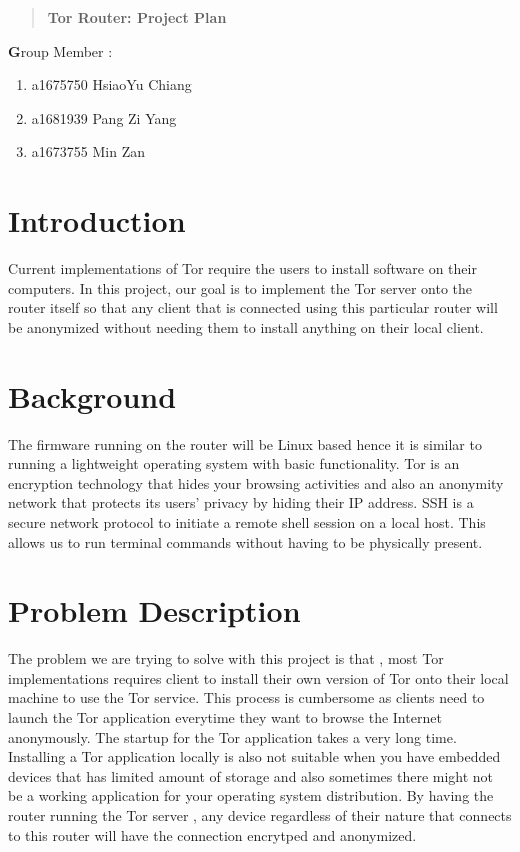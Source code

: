\documentclass[12pt]{article}
\begin{document}
	\begin{quote}
		\centering
		\textbf {Tor Router: Project Plan}
	\end{quote}
	
	\textbf Group Member :
	\begin{enumerate}
		\item a1675750 HsiaoYu Chiang 
		\item a1681939 Pang Zi Yang
		\item a1673755 Min Zan 
	\end{enumerate}
	
	\section{Introduction}
	
	 Current implementations of Tor require the users to install software on their computers. In this project, our goal is to implement the Tor server onto the router itself so that any client that is connected using this particular router will be anonymized without needing them to install anything on their local client.
	
	\section{Background}
	
	The firmware running on the router will be Linux based hence it is similar to running a lightweight operating system with basic functionality. Tor is an encryption technology that hides your browsing activities and also an anonymity network that protects its users' privacy by hiding their IP address. SSH is a secure network protocol to initiate a remote shell session on a local host. This allows us to run terminal commands without having to be physically present.
	
	\section{Problem Description}
	
	The problem we are trying to solve with this project is that , most Tor implementations requires client to install their own version of Tor onto their local machine to use the Tor service. This  process is cumbersome as clients need to launch the Tor application everytime they want to browse the Internet anonymously. The startup for the Tor application takes a very long time. Installing a Tor application locally is also not suitable when you have embedded devices that has limited amount of storage and also sometimes there might not be a working application for your operating system distribution. By having the router running the Tor server , any device regardless of their nature that connects to this router will have the connection encrytped and anonymized. 
	
\end{document}
